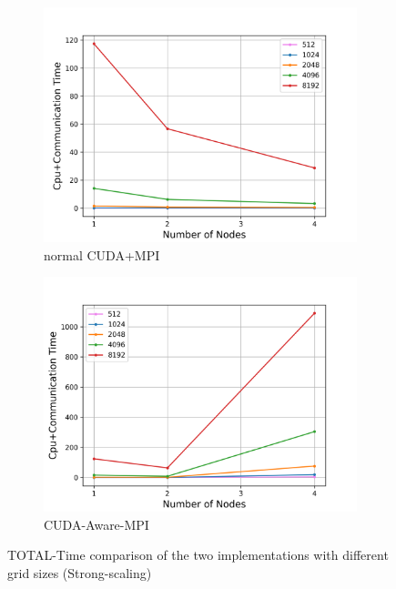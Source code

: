 \documentclass[article]{scrartcl}
\begin{document}
\begin{figure}[htpb]
	\centering
	\begin{subfigure}{.49\textwidth}
		\includegraphics[width=\textwidth,keepaspectratio=true]{../figs/strongscalingCOMM_CUDA.png}
		\caption{normal CUDA+MPI}
		\label{fig:StrongCOMMCUDA}
	\end{subfigure}
	\begin{subfigure}{.49\textwidth}
		\centering
		\includegraphics[width=\textwidth,keepaspectratio=true]{../figs/strongscalingCOMM.png}
		\caption{CUDA-Aware-MPI}
		\label{fig:StrongCOMM}
	\end{subfigure}
	\caption{TOTAL-Time comparison of the two implementations with different grid sizes (Strong-scaling)}
	\label{figs:Compare2}
\end{figure}
 
\end{document}
